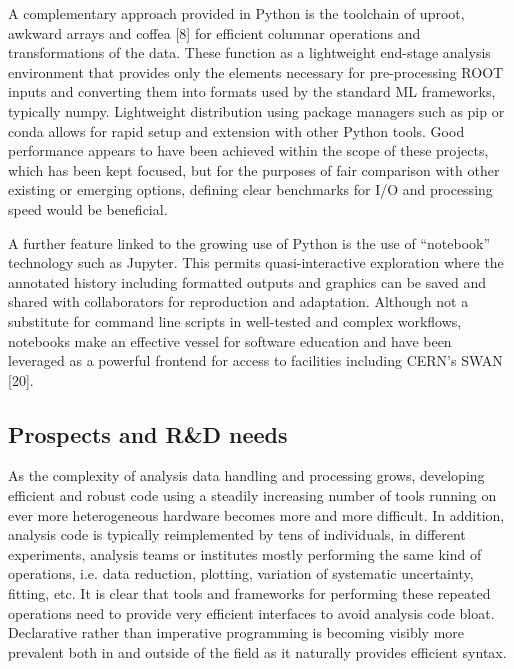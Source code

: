 \documentclass[10pt,a4paper]{article}
\begin{document}
A complementary approach provided in Python is the toolchain of uproot,
awkward arrays and coffea {[}8{]} for efficient columnar operations and
transformations of the data. These function as a lightweight end-stage
analysis environment that provides only the elements necessary for
pre-processing ROOT inputs and converting them into formats used by the
standard ML frameworks, typically numpy. Lightweight distribution using
package managers such as pip or conda allows for rapid setup and
extension with other Python tools. Good performance appears to have been
achieved within the scope of these projects, which has been kept
focused, but for the purposes of fair comparison with other existing or
emerging options, defining clear benchmarks for I/O and processing speed
would be beneficial.

A further feature linked to the growing use of Python is the use of
``notebook'' technology such as Jupyter. This permits quasi-interactive
exploration where the annotated history including formatted outputs and
graphics can be saved and shared with collaborators for reproduction and
adaptation. Although not a substitute for command line scripts in
well-tested and complex workflows, notebooks make an effective vessel
for software education and have been leveraged as a powerful frontend
for access to facilities including CERN's SWAN {[}20{]}.

\hypertarget{prospects-and-rd-needs}{%
\subsection{Prospects and R\&D needs}\label{prospects-and-rd-needs}}

As the complexity of analysis data handling and processing grows,
developing efficient and robust code using a steadily increasing number
of tools running on ever more heterogeneous hardware becomes more and
more difficult. In addition, analysis code is typically reimplemented by
tens of individuals, in different experiments, analysis teams or
institutes mostly performing the same kind of operations, i.e. data
reduction, plotting, variation of systematic uncertainty, fitting, etc.
It is clear that tools and frameworks for performing these repeated
operations need to provide very efficient interfaces to avoid analysis
code bloat. Declarative rather than imperative programming is becoming
visibly more prevalent both in and outside of the field as it naturally
provides efficient syntax.
\end{document}
